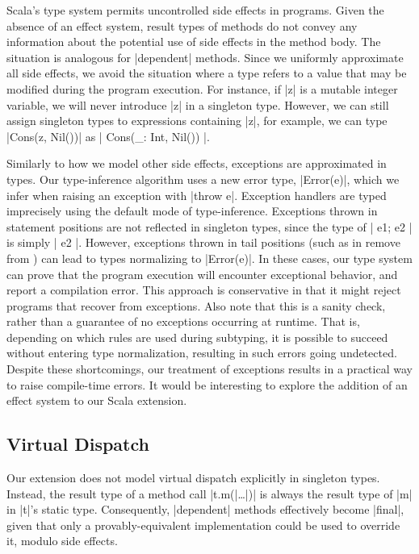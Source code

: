 Scala's type system permits uncontrolled side effects in programs.
Given the absence of an effect system, result types of methods do not convey any information about the potential use of side effects in the method body.
The situation is analogous for |dependent| methods.
Since we uniformly approximate all side effects, we avoid the situation where a type refers to a value that may be modified during the program execution.
For instance, if |z| is a mutable integer variable, we will never introduce |z| in a singleton type.
However, we can still assign singleton types to expressions containing |z|, for example, we can type |Cons(z, Nil())| as |{ Cons(_: Int, Nil()) }|.

Similarly to how we model other side effects, exceptions are approximated in types.
Our type-inference algorithm uses a new error type, |Error(e)|, which we infer when raising an exception with |throw e|.
Exception handlers are typed imprecisely using the default mode of type-inference.
Exceptions thrown in statement positions are not reflected in singleton types, since the type of |{ e1; e2 }| is simply |{ e2 }|.
However, exceptions thrown in tail positions (such as in remove from ) can lead to types normalizing to |Error(e)|.
In these cases, our type system can prove that the program execution will encounter exceptional behavior, and report a compilation error.
This approach is conservative in that it might reject programs that recover from exceptions.
Also note that this is a sanity check, rather than a guarantee of no exceptions occurring at runtime.
That is, depending on which rules are used during subtyping, it is possible to succeed without entering type normalization, resulting in such errors going undetected.
Despite these shortcomings, our treatment of exceptions results in a practical way to raise compile-time errors.
It would be interesting to explore the addition of an effect system to our Scala extension.

\subsection{Virtual Dispatch}

Our extension does not model virtual dispatch explicitly in singleton types.
Instead, the result type of a method call |t.m(|\ldots{}|)| is always the result type of |m| in |t|'s static type.
Consequently, |dependent| methods effectively become |final|, given that only a provably-equivalent implementation could be used to override it, modulo side effects.

